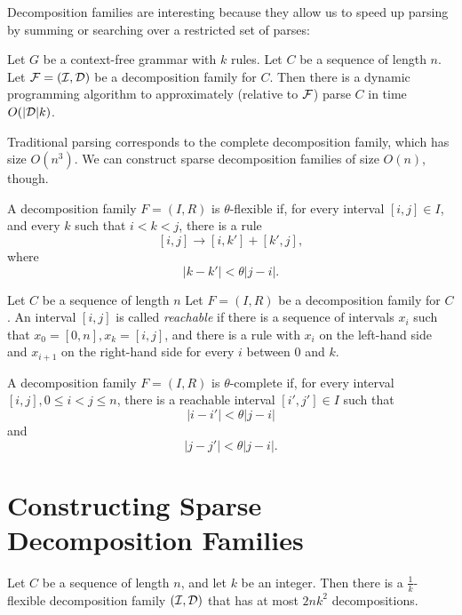 Decomposition families are interesting because they allow us to speed
up parsing by summing or searching over a restricted set of parses:
\begin{thm}
  Let $G$ be a context-free grammar with $k$ rules. Let $C$ be a
  sequence of length $n$. Let ${\mathcal F}=({\mathcal I},{\mathcal D})$ be a decomposition
  family for $C$. Then there is a dynamic programming algorithm to
  approximately (relative to ${\mathcal F}$) parse $C$ in time $O(|{\mathcal D}|k)$.
\end{thm}
Traditional parsing corresponds to the complete decomposition family,
which has size $O(n^3)$. We can construct sparse decomposition
families of size $O(n)$, though.

\begin{defn}
A decomposition family $F=(I,R)$ is $\theta$-flexible if, for every interval
$[i,j]\in I$, and every $k$ such that $i<k<j$, there is a rule
$$[i,j] \to [i,k'] + [k',j],$$
where 
$$|k-k'| < \theta |j-i|.$$
\end{defn}

\begin{defn}
Let $C$ be a sequence of length $n$ Let $F=(I,R)$ be a decomposition
family for $C$.  An interval $[i,j]$ is called {\em reachable} if
there is a sequence of intervals $x_i$ such that $x_0=[0,n],
x_k=[i,j]$, and there is a rule with $x_i$ on the left-hand side and
$x_{i+1}$ on the right-hand side for every $i$ between $0$ and $k$.
\end{defn}

\begin{defn}
A decomposition family $F=(I,R)$ is $\theta$-complete if, for every
interval $[i,j], 0\le i< j \le n$, there is a reachable interval
$[i',j']\in I$ such that
$$|i-i'| < \theta |j-i|$$
and
$$|j-j'| < \theta |j-i|.$$
\end{defn}

\section{Constructing Sparse Decomposition Families}

\begin{thm}
  Let $C$ be a sequence of length $n$, and let $k$ be an integer. Then
  there is a $\frac{1}{k}$-flexible decomposition family $({\mathcal I},{\mathcal D})$
  that has at most $2nk^2$ decompositions.
\end{thm}


